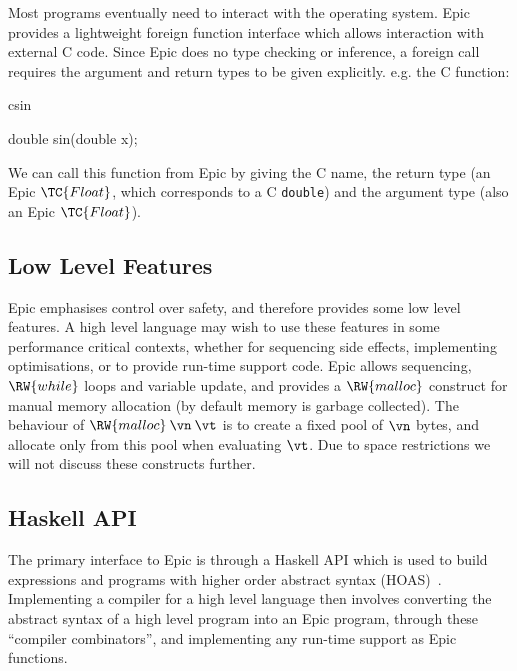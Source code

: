Most programs eventually need to interact with the operating
system. Epic provides a lightweight foreign function interface which
allows interaction with external C code.
Since Epic does no type checking or inference,
a foreign call requires the argument and return types to be given
explicitly. e.g. the C function:

\begin{SaveVerbatim}{csin}

double sin(double x);

\end{SaveVerbatim}

\noindent
We can call this function from Epic by giving the C name, the return
type (an Epic $\TC{Float}$, which corresponds to a C \texttt{double})
and the argument type (also an Epic $\TC{Float}$).


\subsection{Low Level Features}

Epic emphasises control over safety, and therefore provides some low
level features. A high level language may wish to use these features
in some performance critical contexts, whether for sequencing side
effects, implementing optimisations, or to provide run-time support
code. 
Epic allows sequencing, $\RW{while}$ loops and variable update, and
provides a $\RW{malloc}$ construct for manual memory allocation (by default
memory is garbage collected). The
behaviour of $\RW{malloc}\:\vn\:\vt$ is to create a fixed pool of
$\vn$ bytes, and allocate only from this pool when evaluating
$\vt$. Due to space restrictions we will not discuss these constructs further. 

\subsection{Haskell API}

The primary interface to Epic is through a Haskell API which is used to build
expressions and programs with higher order abstract syntax (HOAS)~\cite{hoas}.
Implementing a compiler for a high level language then involves 
converting the abstract syntax of a high level program into an Epic program,
through these ``compiler combinators'', and implementing any run-time support
as Epic functions.

